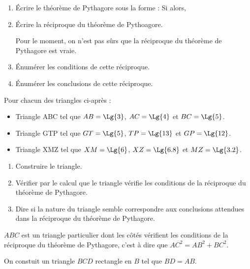 \begin{activite}
    \begin{enumerate}
        \item Écrire le théorème de Pythagore sous la forme : \og Si \makebox[0.1\linewidth]{\dotfill} alors, \makebox[0.1\linewidth]{\dotfill} \fg
        \item Écrire la réciproque du théorème de Pythoagore.
        
        Pour le moment, on n'est pas sûrs que la réciproque du théorème de Pythagore est vraie.
        \item Énumérer les conditions de cette réciproque.
        \item Énumérer les conclusions de cette réciproque.
    \end{enumerate}

    \partie[Conjecture]
    Pour chacun des triangles ci-après :
    \begin{itemize}
        \item Triangle ABC tel que $AB=\Lg{3}$, $AC=\Lg{4}$ et $BC=\Lg{5}$.
        \item Triangle GTP tel que $GT=\Lg{5}$, $TP=\Lg{13}$ et $GP=\Lg{12}$.
        \item Triangle XMZ tel que $XM=\Lg{6}$, $XZ=\Lg{6.8}$ et $MZ=\Lg{3.2}$.
    \end{itemize}
    \begin{enumerate}
        \item Construire le triangle.
        \item Vérifier par le calcul que le triangle vérifie les conditions de la réciproque du théorème de Pythagore.
        \item Dire si la nature du triangle semble correspondre aux conclusions attendues dans la réciproque du théorème de Pythagore.
    \end{enumerate}

    \partie[Démonstration]
    $ABC$ est un triangle particulier dont les côtés vérifient les conditions de la réciproque du théorème de Pythagore, c'est à dire que $AC^2=AB^2+BC^2$.

    On constuit un triangle $BCD$ rectangle en $B$ tel que $BD=AB$.


\end{activite}
